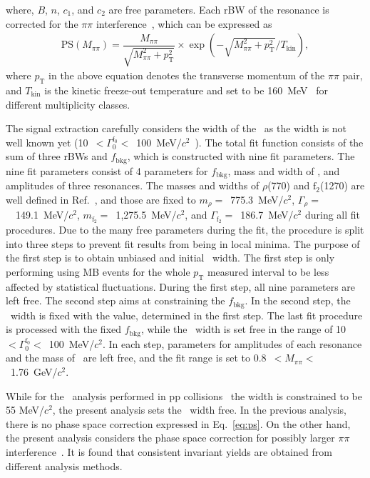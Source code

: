 where, $B$, $n$, $c_{1}$, and $c_{2}$ are free parameters. Each rBW of the resonance is corrected for the $\pi\pi$ interference~\cite{Rapp:2003ar}, which can be expressed as
\begin{eqnarray}
\mathrm{PS}(M_{\pi\pi}) = \dfrac{M_{\pi\pi}}{\sqrt{M_{\pi\pi}^{2}+p_{\mathrm{T}}^{2}}}\times\exp{(-\sqrt{M_{\pi\pi}^{2}+p_{\mathrm{T}}^{2}}/T_{\mathrm{kin}})},
\label{eq:ps}
\end{eqnarray} 
where $p_{\mathrm{T}}$ in the above equation denotes the transverse momentum of the $\pi\pi$ pair, and $T_{\mathrm{kin}}$ is the kinetic freeze-out temperature and set to be 160~MeV~\cite{ALICE:2018qdv} for different multiplicity classes.

The signal extraction carefully considers the width of the \fzero~as the width is not well known yet (10~$<\Gamma_{0}^{\mathrm{f}_{0}}<$~100~MeV/$c^{2}$~\cite{ParticleDataGroup:2020ssz}). The total fit function consists of the sum of three rBWs and $f_{\mathrm{bkg}}$, which is constructed with nine fit parameters. The nine fit parameters consist of 4 parameters for $f_{\mathrm{bkg}}$, mass and width of \fzero, and amplitudes of three resonances. The masses and widths of $\rho$(770) and $\mathrm{f}_{2}$(1270) are well defined in Ref.~\cite{ParticleDataGroup:2020ssz}, and those are fixed to $m_{\rho}=$~775.3~MeV/$c^{2}$, $\Gamma_{\rho}=$~~149.1~MeV/$c^{2}$, $m_{\mathrm{f}_{2}}=$~1,275.5~MeV/$c^{2}$, and $\Gamma_{\mathrm{f}_{2}}=$~186.7~MeV/$c^{2}$ during all fit procedures. Due to the many free parameters during the fit, the procedure is split into three steps to prevent fit results from being in local minima. The purpose of the first step is to obtain unbiased and initial \fzero~width. The first step is only performing using MB events for the whole $p_{\mathrm{T}}$ measured interval to be less affected by statistical fluctuations. During the first step, all nine parameters are left free. The second step aims at constraining the $f_{\mathrm{bkg}}$. In the second step, the \fzero~width is fixed with the value, determined in the first step. The last fit procedure is processed with the fixed $f_{\mathrm{bkg}}$, while the \fzero~width is set free in the range of 10~$<\Gamma_{0}^{\mathrm{f}_{0}}<$~100~MeV/$c^{2}$. In each step, parameters for amplitudes of each resonance and the mass of \fzero~are left free, and the fit range is set to 0.8~$<M_{\pi\pi}<$~1.76~GeV/$c^{2}$.

While for the \fzero~analysis performed in pp collisions~\cite{ALICE:2022qnb} the width is constrained to be 55 MeV/$c^{2}$, the present analysis sets the \fzero~width free. In the previous analysis, there is no phase space correction expressed in Eq.~\ref{eq:ps}. On the other hand, the present analysis considers the phase space correction for possibly larger $\pi\pi$ interference~\cite{STAR:2003vqj}. It is found that consistent invariant yields are obtained from different analysis methods.

